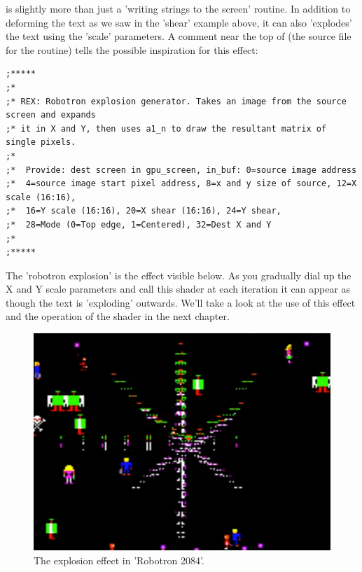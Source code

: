  is slightly more than just a 'writing strings to the screen' routine. In addition to deforming the text as we saw in the
'shear' example above, it can also 'explodes' the text using the 'scale' parameters. A comment near the top of  (the
source file for the  routine) tells the possible inspiration for this effect:

\begin{lstlisting}
;*****
;*
;* REX: Robotron explosion generator. Takes an image from the source screen and expands
;* it in X and Y, then uses a1_n to draw the resultant matrix of single pixels.
;*
;*  Provide: dest screen in gpu_screen, in_buf: 0=source image address
;*  4=source image start pixel address, 8=x and y size of source, 12=X scale (16:16),
;*  16=Y scale (16:16), 20=X shear (16:16), 24=Y shear,
;*  28=Mode (0=Top edge, 1=Centered), 32=Dest X and Y 
;*
;*****
\end{lstlisting}

The 'robotron explosion' is the effect visible below. As you gradually dial up the X and Y scale parameters and call this shader at each
iteration it can appear as though the text is 'exploding' outwards. We'll take a look at the use of this effect and the operation of the shader in the next
chapter.

\begin{figure}[H]
    \centering
    \begin{adjustbox}{width=9cm,center}
      \includegraphics[width=12cm]{src/characters/robotron.png}%
    \end{adjustbox}
\caption{The explosion effect in 'Robotron 2084'.}
\end{figure}


